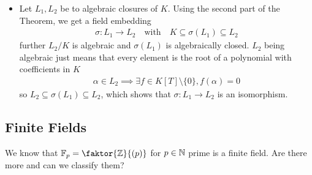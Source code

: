 \begin{itemize}
	\item Let $L_1,L_2$ be to algebraic closures of $K$. Using the second part of the Theorem, we get a field embedding 
		\begin{align*}
			\sigma: L_1 \to L_2 \quad \text{with} \quad K \subseteq \sigma(L_1) \subseteq L_2
	\end{align*}
	further $L_2/K$ is algebraic and $\sigma(L_1)$ is algebraically closed. $L_2$ being algebraic just means that every element is the root of a polynomial with coefficients in $K$
	\begin{align*}
		\alpha \in L_2 \implies \exists f \in K[T] \setminus \{0\}, f(\alpha) = 0
	\end{align*}
	so $L_2 \subseteq \sigma(L_1) \subseteq L_2$, which shows that $\sigma: L_1 \to L_2$ is an isomorphism.
\end{itemize}

\subsection{Finite Fields}
We know that $\F_p = \faktor{\Z}{(p)}$ for $p \in \mathbb{N}$ prime is a finite field. Are there more and can we classify them?

